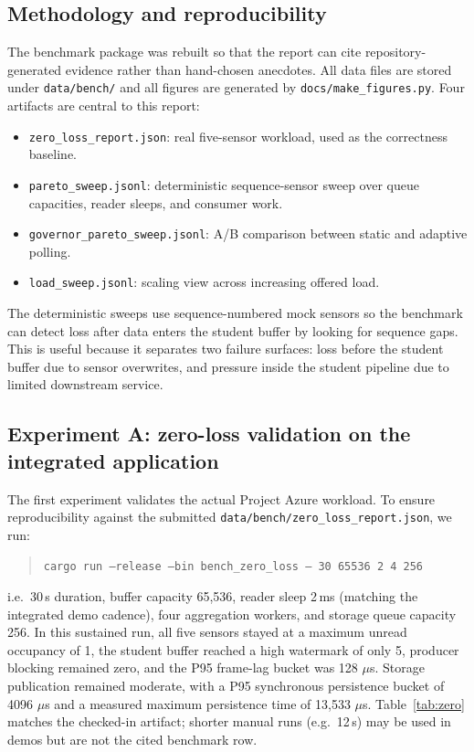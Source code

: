 \documentclass[11pt]{article}
\begin{document}
\subsection*{Methodology and reproducibility}
The benchmark package was rebuilt so that the report can cite repository-generated evidence rather than hand-chosen anecdotes. All data files are stored under \texttt{data/bench/} and all figures are generated by \texttt{docs/make\_figures.py}. Four artifacts are central to this report:
\begin{itemize}
\item \texttt{zero\_loss\_report.json}: real five-sensor workload, used as the correctness baseline.
\item \texttt{pareto\_sweep.jsonl}: deterministic sequence-sensor sweep over queue capacities, reader sleeps, and consumer work.
\item \texttt{governor\_pareto\_sweep.jsonl}: A/B comparison between static and adaptive polling.
\item \texttt{load\_sweep.jsonl}: scaling view across increasing offered load.
\end{itemize}

The deterministic sweeps use sequence-numbered mock sensors so the benchmark can detect loss after data enters the student buffer by looking for sequence gaps. This is useful because it separates two failure surfaces: loss before the student buffer due to sensor overwrites, and pressure inside the student pipeline due to limited downstream service.

\subsection*{Experiment A: zero-loss validation on the integrated application}
The first experiment validates the actual Project Azure workload. To ensure reproducibility against the submitted \texttt{data/bench/zero\_loss\_report.json}, we run:
\begin{quote}
\texttt{cargo run --release --bin bench\_zero\_loss -- 30 65536 2 4 256}
\end{quote}
\noindent i.e.\ 30\,s duration, buffer capacity 65{,}536, reader sleep 2\,ms (matching the integrated demo cadence), four aggregation workers, and storage queue capacity 256. In this sustained run, all five sensors stayed at a maximum unread occupancy of 1, the student buffer reached a high watermark of only 5, producer blocking remained zero, and the P95 frame-lag bucket was 128 $\mu$s. Storage publication remained moderate, with a P95 synchronous persistence bucket of 4096 $\mu$s and a measured maximum persistence time of 13{,}533 $\mu$s. Table~\ref{tab:zero} matches the checked-in artifact; shorter manual runs (e.g.\ 12\,s) may be used in demos but are not the cited benchmark row.
\end{document}
